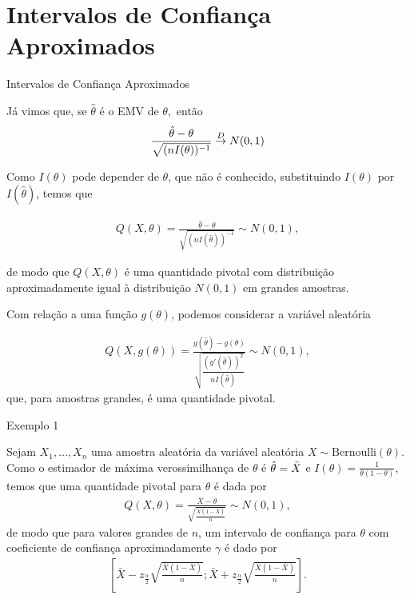 \documentclass[12pt]{beamer}
\begin{document}
\section{Intervalos de Confiança Aproximados}
\begin{frame}{Intervalos de Confiança Aproximados}
\begin{block}{}
\justifying
Já vimos que, se $\hat{\theta}$ é o EMV de $\theta,$ então 
\begin{align*}
    \dfrac{\hat{\theta}-\theta}{\sqrt{(nI(\theta))^{-1}}}\overset{D}{\rightarrow} N(0,1)
\end{align*}
\end{block}
\pause
\begin{block}{}
\justifying
Como $I(\theta)$ pode depender de $\theta$, que não é conhecido, substituindo $I(\theta)$ por $I(\hat{\theta})$, temos que

\begin{align*}
Q(X, \theta) = \frac{\hat{\theta} - \theta}{\sqrt{(nI(\hat{\theta}))^{-1}}} \sim N(0, 1),
\end{align*}

de modo que $Q(X, \theta)$ é uma quantidade pivotal com distribuição aproximadamente igual à distribuição $N(0, 1)$ em grandes amostras.
\end{block}
\end{frame}

\begin{frame}{}
\begin{block}{}
\justifying
Com relação a uma função $g(\theta)$, podemos considerar a variável aleatória

\begin{align*}
Q(X, g(\theta)) = \frac{g(\hat{\theta}) - g(\theta)}{\sqrt{\dfrac{(g'(\hat{\theta}))^2}{nI(\hat{\theta})}}} \sim N(0, 1),
\end{align*}
que, para amostras grandes, é uma quantidade pivotal.
\end{block}
\end{frame}

\begin{frame}{Exemplo 1}
\begin{block}{}
\justifying
Sejam $X_1, \ldots, X_n$ uma amostra aleatória da variável aleatória $X \sim \text{Bernoulli}(\theta)$. Como o estimador de máxima verossimilhança de $\theta$ é $\hat{\theta} = \Bar{X}$ e $I(\theta) = \frac{1}{\theta(1 - \theta)}$, temos que uma quantidade pivotal para $\theta$ é dada por
\begin{align*}
Q(X, \theta) = \frac{\bar{X} - \theta}{\sqrt{\frac{\bar{X}(1-\bar{X})}{n}}} \sim N(0, 1),
\end{align*}
de modo que para valores grandes de $n$, um intervalo de confiança para $\theta$ com coeficiente de confiança aproximadamente $\gamma$ é dado por
\begin{align*}
\left[ \bar{X} - z_{\frac{\alpha}{2}} \sqrt{\frac{\bar{X}(1 - \bar{X})}{n}} ; \bar{X} + z_{\frac{\alpha}{2}} \sqrt{\frac{\bar{X}(1 - \bar{X})}{n}} \right].
\end{align*}
\end{block}
\end{frame}
\end{document}
